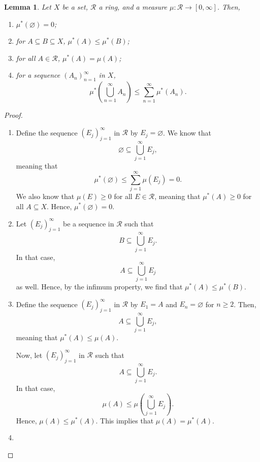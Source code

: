 \documentclass[a4paper, openany]{memoir}
\theoremstyle{definition}
\theoremstyle{plain}
\newtheorem{lemma}[definition]{Lemma}
\begin{document}
    \begin{lemma}
        Let $X$ be a set, $\mathcal{R}$ a ring, and a measure $\mu \colon \mathcal{R} \to [0, \infty]$. Then,
        \begin{enumerate}
            \item $\mu^*(\varnothing) = 0$;
            \item for $A \subseteq B \subseteq X$, $\mu^*(A) \leq \mu^*(B)$;
            \item for all $A \in \mathcal{R}$, $\mu^*(A) = \mu(A)$;
            \item for a sequence $(A_n)_{n=1}^\infty$ in $X$,
            \[\mu^* \left(\bigcup_{n=1}^\infty A_n\right) \leq \sum_{n=1}^\infty \mu^* (A_n).\]
        \end{enumerate}
    \end{lemma}
    \begin{proof}
        \hspace{0pt}
        \begin{enumerate}
            \item Define the sequence $(E_j)_{j=1}^\infty$ in $\mathcal{R}$ by $E_j = \varnothing$. We know that
            \[\varnothing \subseteq \bigcup_{j=1}^\infty E_j,\]
            meaning that 
            \[\mu^*(\varnothing) \leq \sum_{j=1}^\infty \mu(E_j) = 0.\]
            We also know that $\mu(E) \geq 0$ for all $E \in \mathcal{R}$, meaning that $\mu^*(A) \geq 0$ for all $A \subseteq X$. Hence, $\mu^*(\varnothing) = 0$.

            \item Let $(E_j)_{j=1}^\infty$ be a sequence in $\mathcal{R}$ such that
            \[B \subseteq \bigcup_{j=1}^\infty E_j.\]
            In that case,
            \[A \subseteq \bigcup_{j=1}^\infty E_j\]
            as well. Hence, by the infimum property, we find that $\mu^*(A) \leq \mu^*(B)$.
            
            \item Define the sequence $(E_j)_{j=1}^\infty$ in $\mathcal{R}$ by $E_1 = A$ and $E_n = \varnothing$ for $n \geq 2$. Then,
            \[A \subseteq \bigcup_{j=1}^\infty E_j,\]
            meaning that $\mu^*(A) \leq \mu(A)$. 

            Now, let $(E_j)_{j=1}^\infty$ in $\mathcal{R}$ such that
            \[A \subseteq \bigcup_{j=1}^\infty E_j.\]
            In that case,
            \[\mu(A) \leq \mu \left(\bigcup_{j=1}^\infty E_j\right).\]
            Hence, $\mu(A) \leq \mu^*(A)$. This implies that $\mu(A) = \mu^*(A)$.
            
            \item 
        \end{enumerate}
    \end{proof}
\end{document}
